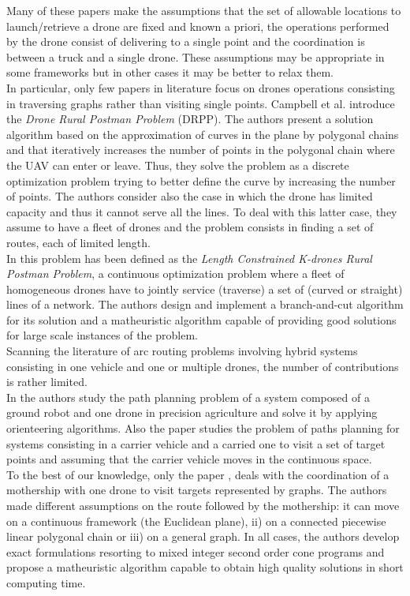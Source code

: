 Many of these papers make the assumptions that the set of allowable locations to launch/retrieve a drone are fixed and known a priori, the operations performed by the drone consist of delivering to a single point and the coordination is between a truck and a single drone. These assumptions may be appropriate in some frameworks but in other cases it may be better to relax them.\\
\noindent
In particular, only few papers in literature focus on drones operations consisting in traversing graphs rather than visiting single points. Campbell et al. 
\cite{art:Campbell2018} introduce the \textit{Drone Rural Postman Problem} (DRPP). The authors present a solution algorithm based on the approximation of curves in the plane by polygonal chains and that iteratively increases the number of points in the polygonal chain where the UAV can enter or leave. Thus, they solve the problem as a discrete optimization problem trying to better define the curve by increasing the number of points. The authors consider also the case in which the drone has limited capacity and thus it cannot serve all the lines. To deal with this latter case, they assume to have a fleet of drones and the problem consists in finding a set of routes, each of limited length.\\
In \cite{art:CAMPBELL202160}  this problem has been defined as the \textit{Length Constrained K-drones Rural Postman Problem}, a continuous optimization problem where a fleet of homogeneous drones have to jointly service (traverse) a set of (curved or straight) lines of a network. The authors design and implement a branch-and-cut algorithm for its solution and a matheuristic algorithm capable of providing good solutions for large scale instances of the problem.\\
Scanning the literature of arc routing problems involving hybrid systems consisting in one vehicle and one or multiple drones, the number of contributions is rather limited.\\
In \cite{art:Tokekar2016} the authors study the path planning problem of a system composed of a ground robot and one drone in precision agriculture and solve it by applying orienteering algorithms. Also the paper \cite{art:Garone2010} studies the problem of paths planning for systems consisting in a carrier vehicle and a carried one to visit a set of target points and assuming that the carrier vehicle moves in the continuous space.\\
To the best of our knowledge, only the paper \cite{art:Amorosi2021}, deals with the coordination of a mothership with one drone to visit targets represented by graphs. The authors made different assumptions on the route followed by the mothership: it can move on a continuous framework (the Euclidean plane), ii) on a connected piecewise linear polygonal chain or iii) on a general graph. In all cases, the authors develop exact formulations resorting to mixed integer second order cone programs and propose a matheuristic algorithm capable to obtain high quality solutions in short computing time.
